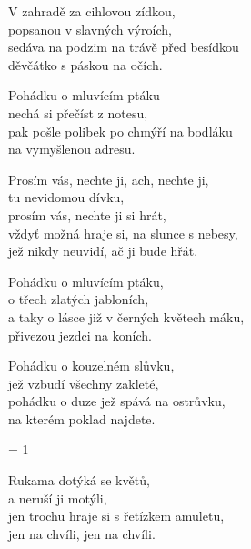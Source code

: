 
\ve{}
V zahradě za cihlovou zídkou,\\
popsanou v slavných výroích,\\
sedáva na podzim na trávě před besídkou\\
děvčátko s páskou na očích. 

\ve{}
Pohádku o mluvícím ptáku\\
nechá si přečíst z notesu,\\
pak pošle polibek po chmýří na bodláku\\
na vymyšlenou adresu.

\cho{}
Prosím vás, nechte ji, ach, nechte ji,\\
tu nevidomou dívku,\\
prosím vás, nechte ji si hrát,\\
vždyť možná hraje si, na slunce s nebesy,\\
jež nikdy neuvidí, ač ji bude hřát.

\ve{}
Pohádku o mluvícím ptáku,\\
o třech zlatých jabloních,\\
a taky o lásce již v černých květech máku,\\
přivezou jezdci na koních.

\ve{}
Pohádku o kouzelném slůvku,\\
jež vzbudí všechny zakleté,\\
pohádku o duze jež spává na ostrůvku,\\
na kterém poklad najdete.

\cho{}

= 1

\ve{}
Rukama dotýká se květů,\\
a neruší ji motýli,\\
jen trochu hraje si s řetízkem amuletu,\\
jen na chvíli, jen na chvíli.

\cho{}

\esong{}